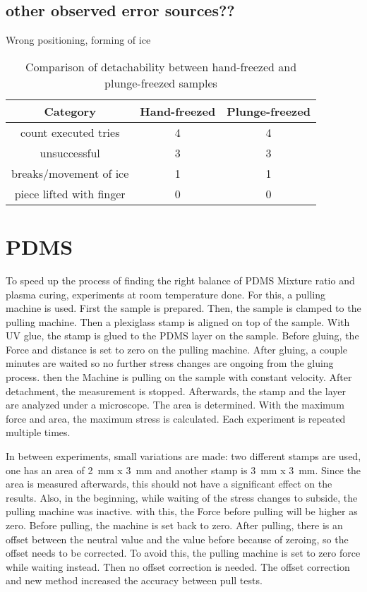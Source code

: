 \subsection{other observed error sources??}

Wrong positioning, forming of ice

\begin{table}
	\centering
	\begin{tabular}{|c|c|c|}
		\hline
		Category & Hand-freezed & Plunge-freezed \\
		\hline
		\hline
		count executed tries & 4 & 4\\
		\hline
		unsuccessful & 3 & 3\\
		\hline
		breaks/movement of ice & 1 & 1\\
		\hline
		piece lifted with finger & 0 & 0\\
		\hline		
	\end{tabular}
	\caption{Comparison of detachability between hand-freezed and plunge-freezed samples}
\end{table}

\section{PDMS}

To speed up the process of finding the right balance of PDMS Mixture ratio and plasma curing, experiments at room temperature done. For this, a pulling machine is used. First the sample is prepared. Then, the sample is clamped to the pulling machine. Then a plexiglass stamp is aligned on top of the sample. With UV glue, the stamp is glued to the PDMS layer on the sample. Before gluing, the Force and distance is set to zero on the pulling machine. After gluing, a couple minutes are waited so no further stress changes are ongoing from the gluing process. then the Machine is pulling on the sample with constant velocity. After detachment, the measurement is stopped. Afterwards, the stamp and the layer are analyzed under a microscope. The area is determined. With the maximum force and area, the maximum stress is calculated. Each experiment is repeated multiple times.

In between experiments, small variations are made: two different stamps are used, one has an area of \SI{2}{\milli\meter} x \SI{3}{\milli\meter} and another stamp is \SI{3}{\milli\meter} x \SI{3}{\milli\meter}. Since the area is measured afterwards, this should not have a significant effect on the results. Also, in the beginning, while waiting of the stress changes to subside, the pulling machine was inactive. with this, the Force before pulling will be higher as zero. Before pulling, the machine is set back to zero. After pulling, there is an offset between the neutral value and the value before because of zeroing, so the offset needs to be corrected. To avoid this, the pulling machine is set to zero force while waiting instead. Then no offset correction is needed. The offset correction and new method increased the accuracy between pull tests.

